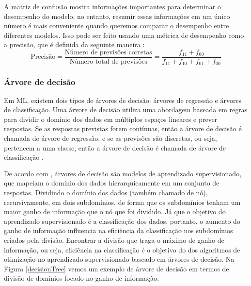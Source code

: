 A matriz de confusão mostra informações importantes para determinar o desempenho
do modelo, no entanto, resumir essas informações em um único número é mais
conveniente quando queremos comparar o desempenho entre  diferentes modelos.
Isso pode ser feito usando uma métrica de desempenho como a precisão, que é
definida da seguinte maneira \cite{tan2009introduccao}:
\[
  \text{Precisão} =
  \frac
    {\text{Número de previsões corretas}}
    {\text{Número total de previsões}} =
  \frac
    {f_{11} + f_{00}}
    {f_{11} + f_{10} + f_{01} + f_{00}}
\]

\subsubsection{Árvore de decisão}

Em ML, existem dois tipos de árvores de decisão: árvores de regressão e árvores
de classificação. Uma árvore de decisão utiliza uma abordagem baseada em regras
para dividir o domínio dos dados em múltiplos espaços lineares e prever
respostas. Se as respostas previstas forem contínuas, então a árvore de decisão
é chamada de árvore de regressão, e se as previsões são discretas, ou seja,
pertencem a uma classe, então a árvore de decisão é chamada de árvore de
classificação \cite{suthaharan2016machine}.

De acordo com , árvores de decisão são modelos
de aprendizado supervisionado, que mapeiam o domínio dos dados hierarquicamente
em um conjunto de respostas. Dividindo o domínio dos dados (também chamado de
nó), recursivamente, em dois subdomínios, de forma que os subdomínios tenham um
maior ganho de informação que o nó que foi dividido. Já que o objetivo do
aprendizado supervisionado é a classificação dos dados, portanto,  o aumento do
ganho de informação influencia na eficiência da classificação nos subdomínios
criados pela divisão. Encontrar a divisão que traga o máximo de ganho de
informação, ou seja, eficiência na classificação é o objetivo do dos algoritmos
de otimização no aprendizado supervisionado baseado em árvores de decisão. Na
Figura \ref{decisionTree} vemos um exemplo de árvore de decisão em termos de
divisão de domínios focado no ganho de informação.


